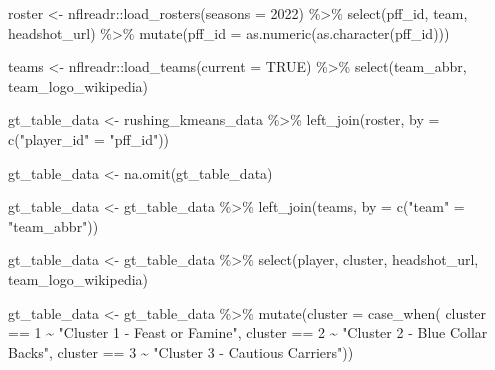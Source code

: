 \documentclass[
  letterpaper,
]{krantz}
\newenvironment{Shaded}{\begin{snugshade}}{\end{snugshade}}
\newcommand{\AttributeTok}[1]{\textcolor[rgb]{0.40,0.45,0.13}{#1}}
\newcommand{\ConstantTok}[1]{\textcolor[rgb]{0.56,0.35,0.01}{#1}}
\newcommand{\DecValTok}[1]{\textcolor[rgb]{0.68,0.00,0.00}{#1}}
\newcommand{\FunctionTok}[1]{\textcolor[rgb]{0.28,0.35,0.67}{#1}}
\newcommand{\NormalTok}[1]{\textcolor[rgb]{0.00,0.23,0.31}{#1}}
\newcommand{\OtherTok}[1]{\textcolor[rgb]{0.00,0.23,0.31}{#1}}
\newcommand{\SpecialCharTok}[1]{\textcolor[rgb]{0.37,0.37,0.37}{#1}}
\newcommand{\StringTok}[1]{\textcolor[rgb]{0.13,0.47,0.30}{#1}}
\begin{document}
\begin{Shaded}
\begin{Highlighting}[]
\NormalTok{roster }\OtherTok{\textless{}{-}}\NormalTok{ nflreadr}\SpecialCharTok{::}\FunctionTok{load\_rosters}\NormalTok{(}\AttributeTok{seasons =} \DecValTok{2022}\NormalTok{) }\SpecialCharTok{\%\textgreater{}\%}
  \FunctionTok{select}\NormalTok{(pff\_id, team, headshot\_url) }\SpecialCharTok{\%\textgreater{}\%}
  \FunctionTok{mutate}\NormalTok{(}\AttributeTok{pff\_id =} \FunctionTok{as.numeric}\NormalTok{(}\FunctionTok{as.character}\NormalTok{(pff\_id)))}

\NormalTok{teams }\OtherTok{\textless{}{-}}\NormalTok{ nflreadr}\SpecialCharTok{::}\FunctionTok{load\_teams}\NormalTok{(}\AttributeTok{current =} \ConstantTok{TRUE}\NormalTok{) }\SpecialCharTok{\%\textgreater{}\%}
  \FunctionTok{select}\NormalTok{(team\_abbr, team\_logo\_wikipedia)}

\NormalTok{gt\_table\_data }\OtherTok{\textless{}{-}}\NormalTok{ rushing\_kmeans\_data }\SpecialCharTok{\%\textgreater{}\%}
  \FunctionTok{left\_join}\NormalTok{(roster, }\AttributeTok{by =} \FunctionTok{c}\NormalTok{(}\StringTok{"player\_id"} \OtherTok{=} \StringTok{"pff\_id"}\NormalTok{))}

\NormalTok{gt\_table\_data }\OtherTok{\textless{}{-}} \FunctionTok{na.omit}\NormalTok{(gt\_table\_data)}

\NormalTok{gt\_table\_data }\OtherTok{\textless{}{-}}\NormalTok{ gt\_table\_data }\SpecialCharTok{\%\textgreater{}\%}
  \FunctionTok{left\_join}\NormalTok{(teams, }\AttributeTok{by =} \FunctionTok{c}\NormalTok{(}\StringTok{"team"} \OtherTok{=} \StringTok{"team\_abbr"}\NormalTok{))}

\NormalTok{gt\_table\_data }\OtherTok{\textless{}{-}}\NormalTok{ gt\_table\_data }\SpecialCharTok{\%\textgreater{}\%}
  \FunctionTok{select}\NormalTok{(player, cluster, headshot\_url, team\_logo\_wikipedia)}

\NormalTok{gt\_table\_data }\OtherTok{\textless{}{-}}\NormalTok{ gt\_table\_data }\SpecialCharTok{\%\textgreater{}\%}
  \FunctionTok{mutate}\NormalTok{(}\AttributeTok{cluster =} \FunctionTok{case\_when}\NormalTok{(}
\NormalTok{    cluster }\SpecialCharTok{==} \DecValTok{1} \SpecialCharTok{\textasciitilde{}} \StringTok{"Cluster 1 {-} Feast or Famine"}\NormalTok{,}
\NormalTok{    cluster }\SpecialCharTok{==} \DecValTok{2} \SpecialCharTok{\textasciitilde{}} \StringTok{"Cluster 2 {-} Blue Collar Backs"}\NormalTok{,}
\NormalTok{    cluster }\SpecialCharTok{==} \DecValTok{3} \SpecialCharTok{\textasciitilde{}} \StringTok{"Cluster 3 {-} Cautious Carriers"}\NormalTok{))}
\end{Highlighting}
\end{Shaded}
\end{document}
